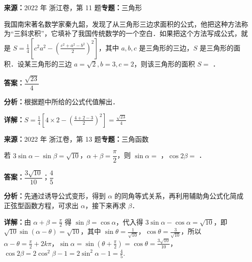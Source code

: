 \begin{question}[points=4]
\textbf{来源：}2022 年 浙江卷，第 11 题\quad \textbf{专题：}三角形\par
我国南宋著名数学家秦九韶，发现了从三角形三边求面积的公式，他把这种方法称为“三斜求积”，它填补了我国传统数学的一个空白．如果把这个方法写成公式，就是 $S = \frac{1}{4}\left[c^2 a^2 - \left(\frac{c^2 + a^2 - b^2}{2}\right)^2\right]$，其中 $a,b,c$ 是三角形的三边，$S$ 是三角形的面积．设某三角形的三边 $a = \sqrt{2}, b = 3, c = 2$，则该三角形的面积 $S =$ ．
\begin{solution}
\textbf{答案：}$\dfrac{\sqrt{23}}{4}$

\textbf{分析：}根据题中所给的公式代值解出．

\textbf{详解：}$S = \frac{1}{4}\left[4\times2 - \left(\frac{4+2-3}{2}\right)^2\right] = \frac{\sqrt{23}}{4}$
\end{solution}
\end{question}

\begin{question}[points=6]
\textbf{来源：}2022 年 浙江卷，第 13 题\quad \textbf{专题：}三角函数\par
若 $3\sin\alpha - \sin\beta = \sqrt{10}$，$\alpha+\beta = \dfrac{\pi}{2}$，则 $\sin\alpha =$ ，$\cos 2\beta =$ ．
\begin{solution}
\textbf{答案：}$\dfrac{3\sqrt{10}}{10}$；$\dfrac{4}{5}$

\textbf{分析：}先通过诱导公式变形，得到 $\alpha$ 的同角等式关系，再利用辅助角公式化简成正弦型函数方程，可求出 $\alpha$，接下来再求 $\beta$．

\textbf{详解：}由 $\alpha+\beta=\frac{\pi}{2}$ 得 $\sin\beta = \cos\alpha$，代入得 $3\sin\alpha - \cos\alpha = \sqrt{10}$，即 $\sqrt{10}\sin(\alpha-\theta)=\sqrt{10}$，其中 $\sin\theta=\frac{1}{\sqrt{10}}$，$\cos\theta=\frac{3}{\sqrt{10}}$，所以 $\alpha-\theta = \frac{\pi}{2}+2k\pi$，$\sin\alpha = \sin(\theta+\frac{\pi}{2}) = \cos\theta = \frac{3\sqrt{10}}{10}$，$\cos2\beta = 2\cos^2\beta-1 = 2\sin^2\alpha-1 = \frac{4}{5}$.
\end{solution}
\end{question}

